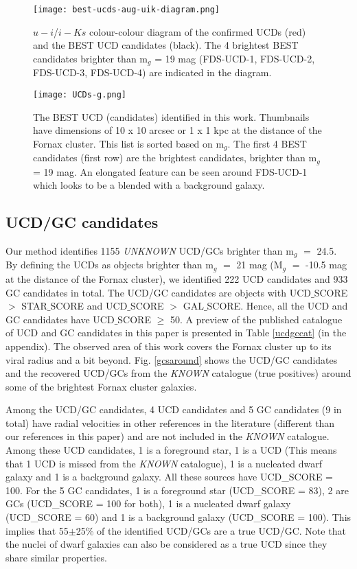 \documentclass[fleqn,usenatbib]{mnras}
\begin{document}
\begin{figure}
\texttt{[image: best-ucds-aug-uik-diagram.png]}
\caption{$u-i$/$i-Ks$ colour-colour diagram of the confirmed UCDs (red) and the BEST UCD candidates (black). The 4 brightest BEST candidates brighter than m$_g$ = 19 mag (FDS-UCD-1, FDS-UCD-2, FDS-UCD-3, FDS-UCD-4) are indicated in the diagram.}
\label{uikbest}
\end{figure}

\begin{figure}
\texttt{[image: UCDs-g.png]}
\caption{The BEST UCD (candidates) identified in this work. Thumbnails have dimensions of 10 x 10 arcsec or 1 x 1 kpc at the distance of the Fornax cluster. This list is sorted based on m$_g$. The first 4 BEST candidates (first row) are the brightest candidates, brighter than m$_g$ = 19 mag. An elongated feature can be seen around FDS-UCD-1 which looks to be a blended with a background galaxy.}
\label{bestucds}
\end{figure}

\subsection{UCD/GC candidates}

Our method identifies 1155 \textit{UNKNOWN} UCD/GCs brighter than m$_g$ $=$ 24.5. By defining the UCDs as objects brighter than m$_g$ $=$ 21 mag (M$_g$ $=$ -10.5 mag at the distance of the Fornax cluster), we identified 222 UCD candidates and 933 GC candidates in total. The UCD/GC candidates are objects with UCD$\_$SCORE $>$ STAR$\_$SCORE and UCD$\_$SCORE $>$ GAL$\_$SCORE. Hence, all the UCD and GC candidates have UCD$\_$SCORE $\geq$ 50. A preview of the published catalogue of UCD and GC candidates in this paper is presented in Table \ref{ucdgccat} (in the appendix). The observed area of this work covers the Fornax cluster up to its viral radius and a bit beyond. Fig. \ref{gcsaround} shows the UCD/GC candidates and the recovered UCD/GCs from the \textit{KNOWN} catalogue (true positives) around some of the brightest Fornax cluster galaxies.

Among the UCD/GC candidates, 4 UCD candidates and 5 GC candidates (9 in total) have radial velocities in other references in the literature (different than our references in this paper) and are not included in the \textit{KNOWN} catalogue. Among these UCD candidates, 1 is a foreground star, 1 is a UCD (This means that 1 UCD is missed from the \textit{KNOWN} catalogue), 1 is a nucleated dwarf galaxy and 1 is a background galaxy. All these sources have UCD\_SCORE = 100. For the 5 GC candidates, 1 is a foreground star (UCD\_SCORE = 83), 2 are GCs (UCD\_SCORE = 100 for both), 1 is a nucleated dwarf galaxy (UCD\_SCORE = 60) and 1 is a background galaxy (UCD\_SCORE = 100). This implies that 55$\pm$25\% of the identified UCD/GCs are a true UCD/GC. Note that the nuclei of dwarf galaxies can also be considered as a true UCD since they share similar properties.
\end{document}
